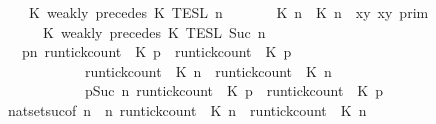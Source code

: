 \begin{isabellebody}
\ \ \ {\isacartoucheopen}{\isasymlbrakk}\ K\ weakly\ precedes\ K\ {\isasymrbrakk}\isactrlsub T\isactrlsub E\isactrlsub S\isactrlsub L\isactrlbsup {\isasymge}\ n\isactrlesup \ {\isacharequal}\isanewline
\ \ \ \ {\isasymlbrakk}\ {\isacharparenleft}{\isasymlceil}{\isacharhash}\isactrlsup {\isasymle}\ K\ n{\isacharcomma}\ {\isacharhash}\isactrlsup {\isasymle}\ K\ n{\isasymrceil}\ {\isasymin}\ {\isacharparenleft}{\isasymlambda}{\isacharparenleft}x{\isacharcomma}y{\isacharparenright}{\isachardot}\ x{\isasymle}y{\isacharparenright}{\isacharparenright}\ {\isasymrbrakk}\isactrlsub p\isactrlsub r\isactrlsub i\isactrlsub m\isanewline
\ \ \ \ {\isasyminter}\ {\isasymlbrakk}\ K\ weakly\ precedes\ K\ {\isasymrbrakk}\isactrlsub T\isactrlsub E\isactrlsub S\isactrlsub L\isactrlbsup {\isasymge}\ Suc\ n\isactrlesup {\isacartoucheclose}\isanewline
%
\isadelimproof
%
\endisadelimproof
%
\isatagproof
{}\isamarkupfalse%
\ {\isacharminus}\isanewline
\ \ \isamarkupfalse%
\ {\isacartoucheopen}{\isacharbraceleft}\ {\isasymrho}{\isachardot}\ {\isasymforall}p{\isasymge}n{\isachardot}\ {\isacharparenleft}run{\isacharunderscore}tick{\isacharunderscore}count\ {\isasymrho}\ K\ p{\isacharparenright}\ {\isasymle}\ {\isacharparenleft}run{\isacharunderscore}tick{\isacharunderscore}count\ {\isasymrho}\ K\ p{\isacharparenright}\ {\isacharbraceright}\isanewline
\ \ \ \ \ \ \ \ \ {\isacharequal}\ {\isacharbraceleft}\ {\isasymrho}{\isachardot}\ {\isacharparenleft}run{\isacharunderscore}tick{\isacharunderscore}count\ {\isasymrho}\ K\ n{\isacharparenright}\ {\isasymle}\ {\isacharparenleft}run{\isacharunderscore}tick{\isacharunderscore}count\ {\isasymrho}\ K\ n{\isacharparenright}\ {\isacharbraceright}\isanewline
\ \ \ \ \ \ \ \ \ {\isasyminter}\ {\isacharbraceleft}\ {\isasymrho}{\isachardot}\ {\isasymforall}p{\isasymge}Suc\ n{\isachardot}\ {\isacharparenleft}run{\isacharunderscore}tick{\isacharunderscore}count\ {\isasymrho}\ K\ p{\isacharparenright}\ {\isasymle}\ {\isacharparenleft}run{\isacharunderscore}tick{\isacharunderscore}count\ {\isasymrho}\ K\ p{\isacharparenright}\ {\isacharbraceright}{\isacartoucheclose}\isanewline
\ \ \ \ \isamarkupfalse%
\ nat{\isacharunderscore}set{\isacharunderscore}suc{\isacharbrackleft}of\ {\isacartoucheopen}n{\isacartoucheclose}\ {\isacartoucheopen}{\isasymlambda}{\isasymrho}\ n{\isachardot}\ {\isacharparenleft}run{\isacharunderscore}tick{\isacharunderscore}count\ {\isasymrho}\ K\ n{\isacharparenright}\ {\isasymle}\ {\isacharparenleft}run{\isacharunderscore}tick{\isacharunderscore}count\ {\isasymrho}\ K\ n{\isacharparenright}{\isacartoucheclose}{\isacharbrackright}\isanewline

\end{isabellebody}

